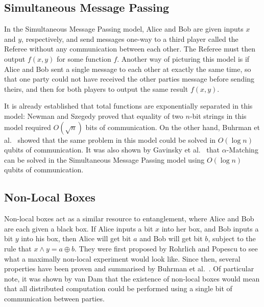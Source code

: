 \documentclass[a4paper]{article}
\begin{document}
        \subsection{Simultaneous Message Passing}

        In the Simultaneous Message Passing model, Alice and Bob are given inputs $x$ and $y$, respectively, and send messages one-way to a third player called the Referee without any communication between each other. The Referee must then output $f(x, y)$ for some function $f$. Another way of picturing this model is if Alice and Bob sent a single message to each other at exactly the same time, so that one party could not have received the other parties message before sending theirs, and then for both players to output the same result $f(x, y)$.

        It is already established that total functions are exponentially separated in this model: Newman and Szegedy \cite{Newman:1996:PVP:237814.238004} proved that equality of two $n$-bit strings in this model required $O(\sqrt{n})$ bits of communication. On the other hand, Buhrman et al.~\cite{PhysRevLett.87.167902} showed that the same problem in this model could be solved in $O(\log n)$ qubits of communication. It was also shown by Gavinsky et al.~\cite{Gavinsky:2007:ESO:1250790.1250866} that $\alpha$-Matching can be solved in the Simultaneous Message Passing model using $O(\log n)$ qubits of communication.

        \subsection{Non-Local Boxes}

        Non-local boxes act as a similar resource to entanglement, where Alice and Bob are each given a black box. If Alice inputs a bit $x$ into her box, and Bob inputs a bit $y$ into his box, then Alice will get bit $a$ and Bob will get bit $b$, subject to the rule that $x \wedge y = a \oplus b$. They were first proposed by Rohrlich and Popescu \cite{quant-ph/9508009} to see what a maximally non-local experiment would look like. Since then, several properties have been proven and summarised by Buhrman et al.~\cite{RevModPhys.82.665}. Of particular note, it was shown by van Dam \cite{Dam2012} that the existence of non-local boxes would mean that all distributed computation could be performed using a single bit of communication between parties.
\end{document}
